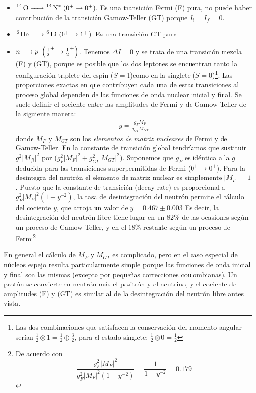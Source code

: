 \begin{itemize}
	\item $\ce{^14 O -> ^14 N^*} \ (0^+\rightarrow0^+)$. Es una transición Fermi (F) pura, no puede haber contribución de la transición Gamow-Teller (GT) porque $I_i=I_f=0$.
	\item $\ce{^6 He -> ^6  Li}  \ (0^+\rightarrow1^+$). Es una transición GT pura.
	\item $n\longrightarrow p \ \parentesis{\frac{1}{2}^+\rightarrow \frac{1}{2}^+}$. Tenemos $\Delta I = 0$ y se trata de una transición mezcla (F) y (GT), porque es posible que los dos leptones se encuentran tanto la configuración triplete del espín ($S=1$)como en la singlete ($S=0$)\footnote{Las dos combinaciones que satisfacen la conservación del momento angular serían $\frac{1}{2}\otimes 1=\frac{1}{2}\oplus \frac{3}{2}$, para el estado singlete: $\frac{1}{2}\otimes 0=\frac{1}{2}$}. Las proporciones exactas en que contribuyen cada una de estas transiciones al proceso global dependen de las funciones de onda nuclear inicial y final. Se suele definir el cociente entre las amplitudes de Fermi y de Gamow-Teller de la siguiente manera:
	\begin{eqnarray}
		y=\frac{g_FM_F}{g_{GT}M_{GT}}
	\end{eqnarray}
	donde $M_F$ y $M_{GT}$ son los \textit{elementos de matriz nucleares} de Fermi y de Gamow-Teller. En la constante de transición global tendríamos que sustituir $g^2 |M_{fi}|^2$ por ($g_F^2|M_F|^2+g_{GT}^2|M_{GT}|^2$). Suponemos que $g_F$ es idéntica a la $g$ deducida para las transiciones superpermitidas de Fermi ($0^+\rightarrow 0^+$). Para la desintegra del neutrón el elemento de matriz nuclear es simplemente $|M_F|=1$. Puesto que la constante de transición (decay rate) es proporcional a $g_F^2 |M_F|^2 (1+y^{-2})$, la tasa de desintegración del neutrón permite el cálculo del cociente $y$, que arroja un valor de $y=0.467\pm 0.003$ Es decir, la desintegración del neutrón libre tiene lugar en un 82\% de las ocasiones según un proceso de Gamow-Teller, y en el $18\%$ restante según un proceso de Fermi\footnote{De acuerdo con \begin{equation*} \frac{g_F^2 |M_F|^2}{g_F^2 |M_F|^2 (1-y^{-2})} = \frac{1}{1+y^{-2}} = 0.179  \end{equation*}}
	
\end{itemize}
En general el cálculo de $M_F$ y $M_{GT}$ es complicado, pero en el caso especial de núcleos espejo resulta particularmente simple porque las funciones de onda inicial y final son las mismas (excepto por pequeñas correcciones coulombianas). Un protón se convierte en neutrón más el positrón y el neutrino, y el cociente de amplitudes (F) y (GT) es similar al de la desintegración del neutrón libre antes vista. 

